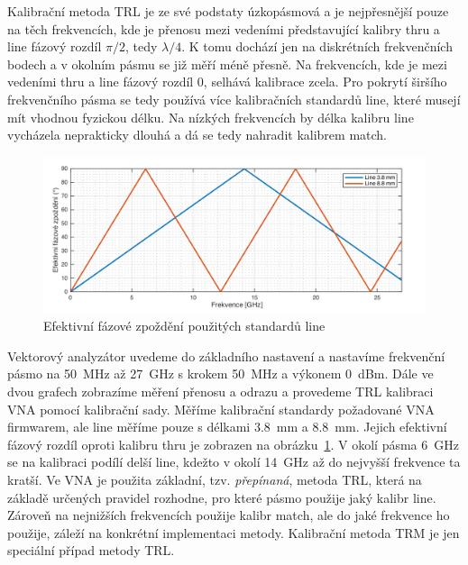 \documentclass[11pt,a4paper]{article}
\begin{document}
Kalibrační metoda TRL je ze své podstaty úzkopásmová a je nejpřesnější pouze na těch frekvencích, kde je přenosu mezi vedeními představující kalibry thru a line fázový rozdíl $\pi/2$, tedy $\lambda/4$. K tomu dochází jen na diskrétních frekvenčních bodech a v okolním pásmu se již měří méně přesně. Na frekvencích, kde je mezi vedeními thru a line fázový rozdíl 0, selhává kalibrace zcela. Pro pokrytí širšího frekvenčního pásma se tedy používá více kalibračních standardů line, které musejí mít vhodnou fyzickou délku. Na nízkých frekvencích by délka kalibru line vycházela neprakticky dlouhá a dá se tedy nahradit kalibrem match.
\begin{figure}[!ht]
    \centering
    \includegraphics[width=.8\textwidth]{src/fazove-zpozdeni.png}
    \caption{\label{fig:fazove-zpozdeni}Efektivní fázové zpoždění použitých standardů line}
\end{figure}

Vektorový analyzátor uvedeme do základního nastavení a nastavíme frekvenční pásmo na 50~MHz až 27~GHz s krokem 50~MHz a výkonem 0~dBm. Dále ve dvou grafech zobrazíme měření přenosu a odrazu a provedeme TRL kalibraci VNA pomocí kalibrační sady. Měříme kalibrační standardy požadované VNA firmwarem, ale line měříme pouze s délkami 3.8~mm a 8.8~mm. Jejich efektivní fázový rozdíl oproti kalibru thru je zobrazen na obrázku~\ref{fig:fazove-zpozdeni}. V okolí pásma 6~GHz se na kalibraci podílí delší line, kdežto v okolí 14~GHz až do nejvyšší frekvence ta kratší. Ve VNA je použita základní, tzv. \emph{přepínaná}, metoda TRL, která na základě určených pravidel rozhodne, pro které pásmo použije jaký kalibr line. Zároveň na nejnižších frekvencích použije kalibr match, ale do jaké frekvence ho použije, záleží na konkrétní implementaci metody. Kalibrační metoda TRM je jen speciální případ metody TRL.
\end{document}
